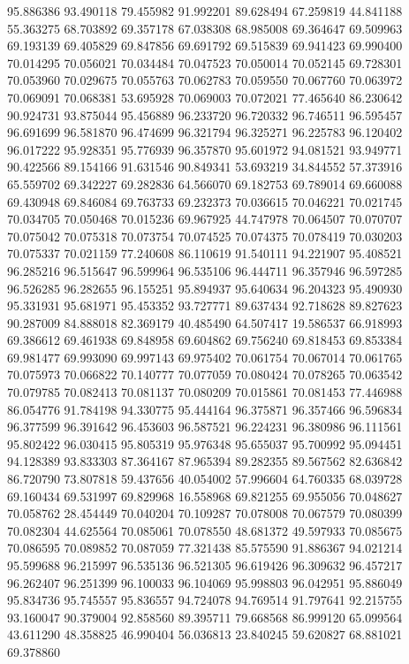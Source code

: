 95.886386
93.490118
79.455982
91.992201
89.628494
67.259819
44.841188
55.363275
68.703892
69.357178
67.038308
68.985008
69.364647
69.509963
69.193139
69.405829
69.847856
69.691792
69.515839
69.941423
69.990400
70.014295
70.056021
70.034484
70.047523
70.050014
70.052145
69.728301
70.053960
70.029675
70.055763
70.062783
70.059550
70.067760
70.063972
70.069091
70.068381
53.695928
70.069003
70.072021
77.465640
86.230642
90.924731
93.875044
95.456889
96.233720
96.720332
96.746511
96.595457
96.691699
96.581870
96.474699
96.321794
96.325271
96.225783
96.120402
96.017222
95.928351
95.776939
96.357870
95.601972
94.081521
93.949771
90.422566
89.154166
91.631546
90.849341
53.693219
34.844552
57.373916
65.559702
69.342227
69.282836
64.566070
69.182753
69.789014
69.660088
69.430948
69.846084
69.763733
69.232373
70.036615
70.046221
70.021745
70.034705
70.050468
70.015236
69.967925
44.747978
70.064507
70.070707
70.075042
70.075318
70.073754
70.074525
70.074375
70.078419
70.030203
70.075337
70.021159
77.240608
86.110619
91.540111
94.221907
95.408521
96.285216
96.515647
96.599964
96.535106
96.444711
96.357946
96.597285
96.526285
96.282655
96.155251
95.894937
95.640634
96.204323
95.490930
95.331931
95.681971
95.453352
93.727771
89.637434
92.718628
89.827623
90.287009
84.888018
82.369179
40.485490
64.507417
19.586537
66.918993
69.386612
69.461938
69.848958
69.604862
69.756240
69.818453
69.853384
69.981477
69.993090
69.997143
69.975402
70.061754
70.067014
70.061765
70.075973
70.066822
70.140777
70.077059
70.080424
70.078265
70.063542
70.079785
70.082413
70.081137
70.080209
70.015861
70.081453
77.446988
86.054776
91.784198
94.330775
95.444164
96.375871
96.357466
96.596834
96.377599
96.391642
96.453603
96.587521
96.224231
96.380986
96.111561
95.802422
96.030415
95.805319
95.976348
95.655037
95.700992
95.094451
94.128389
93.833303
87.364167
87.965394
89.282355
89.567562
82.636842
86.720790
73.807818
59.437656
40.054002
57.996604
64.760335
68.039728
69.160434
69.531997
69.829968
16.558968
69.821255
69.955056
70.048627
70.058762
28.454449
70.040204
70.109287
70.078008
70.067579
70.080399
70.082304
44.625564
70.085061
70.078550
48.681372
49.597933
70.085675
70.086595
70.089852
70.087059
77.321438
85.575590
91.886367
94.021214
95.599688
96.215997
96.535136
96.521305
96.619426
96.309632
96.457217
96.262407
96.251399
96.100033
96.104069
95.998803
96.042951
95.886049
95.834736
95.745557
95.836557
94.724078
94.769514
91.797641
92.215755
93.160047
90.379004
92.858560
89.395711
79.668568
86.999120
65.099564
43.611290
48.358825
46.990404
56.036813
23.840245
59.620827
68.881021
69.378860
